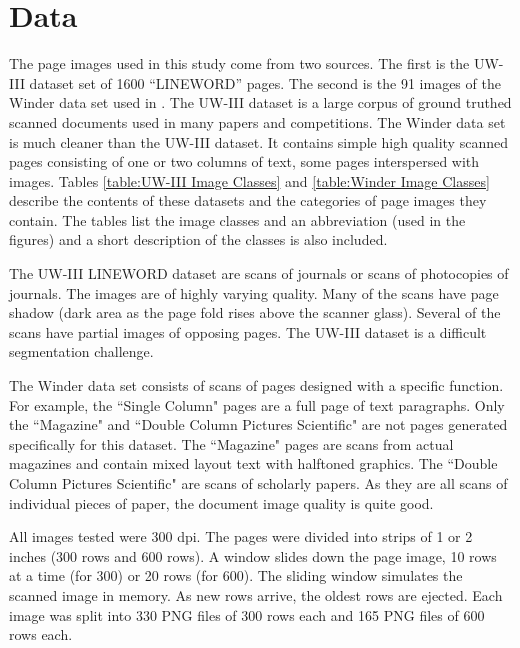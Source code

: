 \documentclass[conference]{IEEEtran}
\begin{document}

\section{Data}

The page images used in this study come from two sources. The first is the UW-III dataset set of
1600 “LINEWORD” pages. The second is the 91 images of the Winder data set used in \cite{winder2010extending}.
The UW-III dataset is a large corpus of ground truthed scanned documents used
in many papers and competitions. 
The Winder data set is much cleaner than the UW-III dataset.
It contains simple high quality scanned pages consisting of one or two
columns of text, some pages interspersed with images. Tables 
\ref{table:UW-III Image Classes} 
and 
\ref{table:Winder Image Classes} 
describe the contents of these datasets
and the categories of page images they contain.  The tables list the image classes 
and an abbreviation (used in the figures) and a short description of the
classes is also included.

The UW-III LINEWORD dataset are scans of journals or scans of photocopies of
journals. The images are of highly varying quality. Many of the scans have page
shadow (dark area as the page fold rises above the scanner glass). 
Several of the scans have partial images of opposing pages. 
The UW-III dataset is a difficult segmentation challenge.

The Winder data set \cite{winder2010extending} consists of 
scans of pages designed with a specific function. For example, the ``Single
Column" pages are a full page of text paragraphs. Only the ``Magazine" and
``Double Column Pictures Scientific" are not pages generated specifically for
this dataset. The ``Magazine" pages are scans from actual magazines and contain
mixed layout text with halftoned graphics. The ``Double Column Pictures
Scientific" are scans of scholarly papers.  As they are all scans of individual
pieces of paper, the document image quality is quite good.

All images tested were 300 dpi.  The pages were divided into strips of 1 or 2 inches
(300 rows and 600 rows). A window slides down the page image, 10 rows at a time
(for 300) or 20 rows (for 600).  The sliding window simulates the scanned image
in memory. As new rows arrive, the oldest rows are ejected.  Each 
image was split into 330 PNG files of 300 rows each and 165 PNG files of 600
rows each.  
\end{document}
